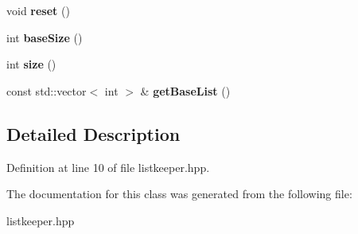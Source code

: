 \begin{DoxyCompactItemize}
\item 
\hypertarget{class_list_keeper_a6a1db853a1b82b7aab43a02ca2f21b30}{void {\bfseries reset} ()}\label{class_list_keeper_a6a1db853a1b82b7aab43a02ca2f21b30}

\item 
\hypertarget{class_list_keeper_a9e5718e2efd3cccd90228928fb9a419e}{int {\bfseries base\-Size} ()}\label{class_list_keeper_a9e5718e2efd3cccd90228928fb9a419e}

\item 
\hypertarget{class_list_keeper_a4f0e62ecaa44cfadd91822da007730f3}{int {\bfseries size} ()}\label{class_list_keeper_a4f0e62ecaa44cfadd91822da007730f3}

\item 
\hypertarget{class_list_keeper_aa9972fe6e4f917980366e7d89428e59d}{const std\-::vector$<$ int $>$ \& {\bfseries get\-Base\-List} ()}\label{class_list_keeper_aa9972fe6e4f917980366e7d89428e59d}

\end{DoxyCompactItemize}


\subsection{Detailed Description}


Definition at line 10 of file listkeeper.\-hpp.



The documentation for this class was generated from the following file\-:\begin{DoxyCompactItemize}
\item 
listkeeper.\-hpp\end{DoxyCompactItemize}
